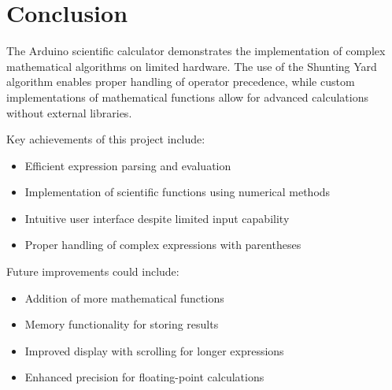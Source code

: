 \documentclass[12pt,a4paper]{article}
\begin{document}
\section{Conclusion}

The Arduino scientific calculator demonstrates the implementation of complex mathematical algorithms on limited hardware. The use of the Shunting Yard algorithm enables proper handling of operator precedence, while custom implementations of mathematical functions allow for advanced calculations without external libraries.

Key achievements of this project include:
\begin{itemize}
    \item Efficient expression parsing and evaluation
    \item Implementation of scientific functions using numerical methods
    \item Intuitive user interface despite limited input capability
    \item Proper handling of complex expressions with parentheses
\end{itemize}

Future improvements could include:
\begin{itemize}
    \item Addition of more mathematical functions
    \item Memory functionality for storing results
    \item Improved display with scrolling for longer expressions
    \item Enhanced precision for floating-point calculations
\end{itemize}
\end{document}
